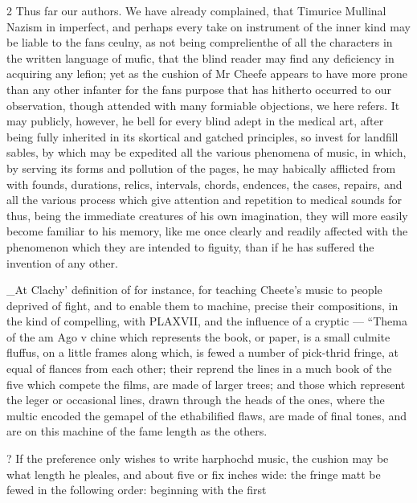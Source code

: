 \documentclass[10pt]{article}
\begin{document}
\begin{multicols}{2}
Thus far our authors. We have already complained, that Timurice Mullinal Nazism in imperfect, and perhaps every take on instrument of the inner kind may be liable to the fans ceulny, as not being comprelienthe of all the characters in the written language of mufic, that the blind reader may find any deficiency in acquiring any lefion; yet as the cushion of Mr Cheefe appears to have more prone than any other infanter for the fans purpose that has hitherto occurred to our observation, though attended with many formiable objections, we here refers. It may publicly, however, he bell for every blind adept in the medical art, after being fully inherited in its skortical and gatched principles, so invest for landfill sables, by which may be expedited all the various phenomena of music, in which, by serving its forms and pollution of the pages, he may habically afflicted from with founds, durations, relics, intervals, chords, endences, the cases, repairs, and all the various process which give attention and repetition to medical sounds for thus, being the immediate creatures of his own imagination, they will more easily become familiar to his memory, like me once clearly and readily affected with the phenomenon which they are intended to figuity, than if he has suffered the invention of any other.

\_At Clachy’ definition of for instance, for teaching Cheete's music to people deprived of fight, and to enable them to machine, precise their compositions, in the kind of compelling, with PLAXVII, and the influence of a cryptic — “Thema of the am Ago v chine which represents the book, or paper, is a small culmite fluffus, on a little frames along which, is fewed a number of pick-thrid fringe, at equal of flances from each other; their reprend the lines in a much book of the five which compete the films, are made of larger trees; and those which represent the leger or occasional lines, drawn through the heads of the ones, where the multic encoded the gemapel of the ethabilified flaws, are made of final tones, and are on this machine of the fame length as the others.

? If the preference only wishes to write harphochd music, the cushion may be what length he pleales, and about five or fix inches wide: the fringe matt be fewed in the following order: beginning with the first

\end{multicols}
\end{document}
